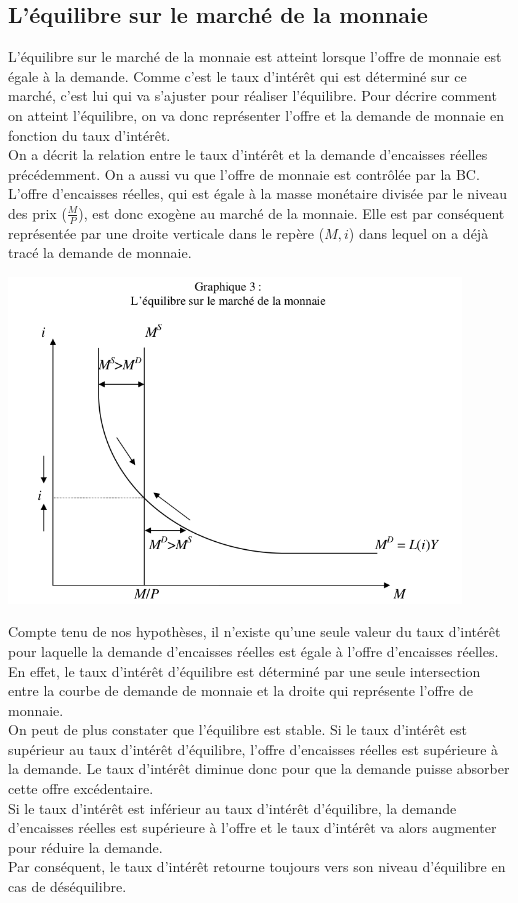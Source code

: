 \documentclass[10pt]{book}
\begin{document}
\subsection{L'équilibre sur le marché de la monnaie}
L'équilibre sur le marché de la monnaie est atteint lorsque l'offre de monnaie est égale à la demande. Comme c'est le taux d'intérêt qui est déterminé sur ce marché, c'est lui qui va s'ajuster pour réaliser l'équilibre. Pour décrire comment on atteint l'équilibre, on va donc représenter l'offre et la demande de monnaie en fonction du taux d'intérêt. \\
On a décrit la relation entre le taux d'intérêt et la demande d'encaisses réelles précédemment. On a aussi vu que l'offre de monnaie est contrôlée par la BC. L'offre d'encaisses réelles, qui est égale à la masse monétaire divisée par le niveau des prix ($\frac{M}{P}$), est donc exogène au marché de la monnaie. Elle est par conséquent représentée par une droite verticale dans le repère ($M,i$) dans lequel on a déjà tracé la demande de monnaie.
\begin{center}
  \includegraphics[width=12cm]{graph18.png}
\end{center}
Compte tenu de nos hypothèses, il n'existe qu'une seule valeur du taux d'intérêt pour laquelle la demande d'encaisses réelles est égale à l'offre d'encaisses réelles. En effet, le taux d'intérêt d'équilibre est déterminé par une seule intersection entre la courbe de demande de monnaie et la droite qui représente l'offre de monnaie. \\
On peut de plus constater que l'équilibre est stable. Si le taux d'intérêt est supérieur au taux d'intérêt d'équilibre, l'offre d'encaisses réelles est supérieure à la demande. Le taux d'intérêt diminue donc pour que la demande puisse absorber cette offre excédentaire. \\
Si le taux d'intérêt est inférieur au taux d'intérêt d'équilibre, la demande d'encaisses réelles est supérieure à l'offre et le taux d'intérêt va alors augmenter pour réduire la demande. \\
Par conséquent, le taux d'intérêt retourne toujours vers son niveau d'équilibre en cas de déséquilibre.
\end{document}
